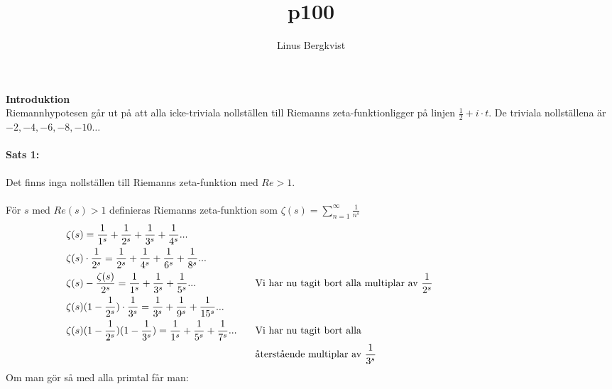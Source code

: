 \documentclass{article}%
\def \width {3mm}
\begin{document}
\title{p100}
\author{Linus Bergkvist}
\date{}
\maketitle
\noindent
{\bf Introduktion}\\
	Riemannhypotesen går ut på att alla icke-triviala nollställen till Riemanns
	zeta-funktionligger på linjen $\frac 1 2 + i \cdot t$. De triviala
	nollställena är $-2, -4, -6, -8, -10 \ldots$

\paragraph{Sats 1:}
Det finns inga nollställen till Riemanns zeta-funktion med $Re > 1$. \\
\\
För $s$ med $Re(s) > 1$ definieras Riemanns zeta-funktion som 
$\zeta(s) = \sum_{n = 1}^\infty \frac {1} {n^s}$ %
\begin{equation}
	\begin{aligned}
		&\zeta(s) = \frac 1 {1^s} + \frac 1 {2^s} + \frac 1 {3^s} + \frac 1 {4^s} ... \notag\\
		&\zeta(s) \cdot \frac 1 {2^s} = \frac 1 {2^s} + \frac 1 {4^s} + \frac 1 {6^s} + \frac 1 {8^s} ... \\
		&\zeta(s) - \frac {\zeta(s)} {2^s} = \frac 1 {1^s} + \frac 1 {3^s} + \frac 1 {5^s} ... &
		\hspace{\width} &\text{Vi har nu tagit bort alla multiplar av } \frac 1 {2^s} \\
		&\zeta(s) (1 - \frac 1 {2^s}) \cdot \frac 1 {3^s} = \frac 1 {3^s} + \frac 1 {9^s} + \frac 1 {15^s} ...\\
		&\zeta(s)(1 - \frac 1 {2^s})(1 - \frac 1 {3^s}) = \frac 1 {1^s} + \frac 1 {5^s} + \frac 1 {7^s} ... &
		\hspace{\width} &\text{Vi har nu tagit bort alla} \\
		& & \hspace{\width} &\text{återstående multiplar av } \frac 1 {3^s} \\
	\end{aligned}
	\phantom{\hspace{4cm}}
\end{equation}
Om man gör så med alla primtal får man: 
\end{document}
